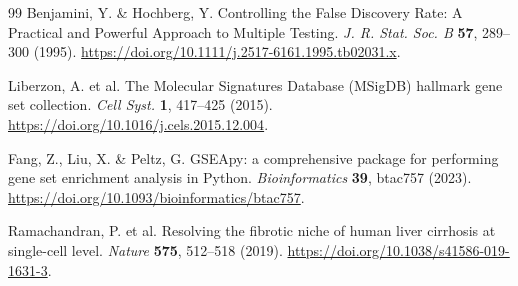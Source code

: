 \documentclass[11pt,a4paper]{article}
\begin{document}
\begin{thebibliography}{99}
 Benjamini, Y. \& Hochberg, Y. Controlling the False Discovery Rate: A Practical and Powerful Approach to Multiple Testing. \textit{J. R. Stat. Soc. B} \textbf{57}, 289–300 (1995). \url{https://doi.org/10.1111/j.2517-6161.1995.tb02031.x}.

 Liberzon, A. et al. The Molecular Signatures Database (MSigDB) hallmark gene set collection. \textit{Cell Syst.} \textbf{1}, 417–425 (2015). \url{https://doi.org/10.1016/j.cels.2015.12.004}.

 Fang, Z., Liu, X. \& Peltz, G. GSEApy: a comprehensive package for performing gene set enrichment analysis in Python. \textit{Bioinformatics} \textbf{39}, btac757 (2023). \url{https://doi.org/10.1093/bioinformatics/btac757}.

 Ramachandran, P. et al. Resolving the fibrotic niche of human liver cirrhosis at single-cell level. \textit{Nature} \textbf{575}, 512–518 (2019). \url{https://doi.org/10.1038/s41586-019-1631-3}.
\end{thebibliography}
\end{document}
